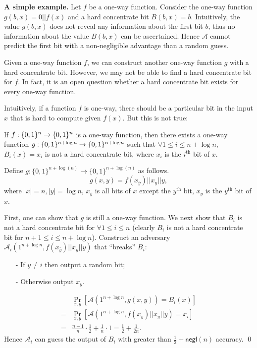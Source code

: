 \documentclass[12pt]{tufte-book}
\begin{document}
\noindent\textbf{A simple example.}
Let $f$ be a one-way function. Consider the one-way function $g(b, x) = 0 || f(x)$ and a hard concentrate bit $B(b, x) = b$.
Intuitively, the value $g(b, x)$ does not reveal any information about the first bit $b$, thus no information about the value $B(b, x)$ can be ascertained. Hence $\mathcal{A}$ cannot predict the first bit with a non-negligible advantage than a random guess.
\begin{remark}
Given a one-way function $f$, we can construct another one-way function $g$ with a hard concentrate bit. However, we may not be able to find a hard concentrate bit for $f$. In fact, it is an open question whether a hard concentrate bit exists for every one-way function.
\end{remark}


\bigskip
Intuitively, if a function $f$ is one-way, there should be a particular bit in the input $x$ that is hard to compute given $f(x)$. But this is not true:
\begin{claim}
If $f:\{0,1\}^{n}\rightarrow \{0,1\}^{n}$ is a one-way function, then there exists a one-way function $g:\{0,1\}^{n+\log n}\rightarrow\{0,1\}^{n+\log n}$ such that $\forall 1 \leq i \leq n+\log n$, $B_i(x) = x_i$ is not a hard concentrate bit, where $x_i$ is the $i^\text{th}$ bit of $x$.
\end{claim}
\proof
Define $g:\{0,1\}^{n+\log(n)} \rightarrow \{0,1\}^{n+\log(n)}$ as follows.
$$g(x,y) = f(x_{\bar y}) || x_y || y,$$
where $|x| = n, |y| = \log n$, $x_{\bar y}$ is all bits of $x$ except the $y^\text{th}$ bit, $x_y$ is the $y^\text{th}$ bit of $x$.

First, one can show that $g$ is still a one-way function. 
We next show that $B_i$ is not a hard concentrate bit for $\forall 1 \leq i \leq n$ (clearly $B_i$ is not a hard concentrate bit for $n+1 \leq i \leq n+\log n$).
Construct an adversary $\mathcal{A}_i(1^{n+\log n}, f(x_{\bar y}) || x_y || y)$ that ``breaks'' $B_i$:
\begin{itemize}
\item[-] If $y \not= i$ then output a random bit;
\item[-] Otherwise output $x_y$.
\end{itemize}
\begin{align*}
& \Pr_{x, y}[\mathcal{A}(1^{n+\log n}, g(x,y)) = B_i(x)]\\
=& \Pr_{x, y}[\mathcal{A}(1^{n+\log n}, f(x_{\bar y}) || x_y || y) = x_i]\\
=& \frac{n-1}{n} \cdot \frac{1}{2} + \frac{1}{n} \cdot 1 = \frac{1}{2} + \frac{1}{2n}.
\end{align*}
Hence $\mathcal{A}_i$ can guess the output of $B_i$ with greater than $\frac{1}{2} + \mathsf{negl}(n)$ accuracy.
\qed
\end{document}
